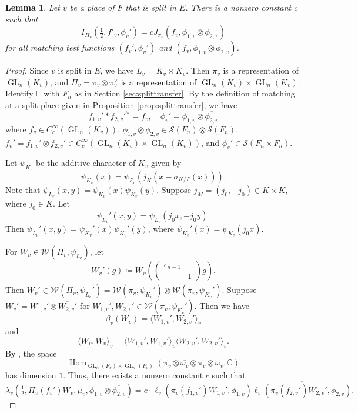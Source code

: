 \documentclass[11pt, reqno]{amsart}
\numberwithin{equation}{subsection}
\theoremstyle{plain}
\newtheorem{lem}[proposition]{Lemma}
\theoremstyle{definition}
\newcommand{\CC}{\mathbb C}
\newcommand{\LL}{\mathbb L}
\newcommand{\ol}{\overline}
\newcommand{\cS}{\mathcal S}
\newcommand{\W}{\mathcal W}
\DeclareMathOperator{\GL}{GL}
\DeclareMathOperator{\Hom}{Hom}
\begin{document}
\begin{lem}
\label{lem:splitlocaldistrid} 
Let $v$ be a place of $F$ that is split in $E$. 
There is a nonzero 
constant $c$ such that 
\[
    I_{\Pi_v}(\tfrac12, f'_v, \phi_v')
    = c J_{\pi_v}(f_v, \phi_{1,v} \otimes \phi_{2,v})
\]
for all matching test functions $(f_v', \phi_v')$
and $(f_v, \phi_{1,v} \otimes \phi_{2,v})$.
\end{lem}
\begin{proof}
Since $v$ is split in $E$, we have $L_v = K_v \times K_v$.
Then $\pi_v$ is a representation of
$\GL_n(K_v)$, and $\Pi_v = \pi_v \otimes \pi_v^\vee$
is a representation of $\GL_n(K_v) \times \GL_n(K_v)$.
Identify $\LL$ with $F_n$ as in Section 
\ref{sec:splittransfer}.
By the definition of matching at a split place given
in Proposition \ref{prop:splittransfer}, we have
\[
    f_{1,v}' \ast f_{2,v}'^\vee = f_v , \quad
    \phi_v' = \phi_{1,v} \otimes \ol{\phi_{2,v}}
\]
where $f_v \in C_c^\infty(\GL_n(K_v))$,
$\phi_{1,v} \otimes \phi_{2,v} \in \cS(F_n)\otimes
\cS(F_n)$, $f_v' = f_{1,v}' \otimes f_{2,v}' 
\in C_c^\infty(\GL_n(K_v) \times \GL_n(K_v))$,
and $\phi_v' \in \cS(F_n \times F_n)$.

Let $\psi_{K_v}$ be the additive character of $K_v$
given by
\[
    \psi_{K_v}(x) = \psi_{F_v}(j_K(x - \sigma_{K/F}(x))).
\]
Note that $\psi_{L_v}(x, y) = \psi_{K_v}(x)\psi_{K_v}(y)$.
Suppose $j_M = (j_0, -j_0) \in K \times K$, where
$j_0 \in K$.
Let 
\[
    \psi_{L_v}'(x, y) = \psi_{L_v}(j_0x, -j_0y).
\]
Then $\psi_{L_v}'(x, y) = \psi_{K_v}'(x)
\ol{\psi_{K_v}'(y)}$, where
$\psi_{K_v}'(x) = \psi_{K_v}(j_0x)$.

For $W_v \in \W(\Pi_v, \psi_{L_v})$, let
\[
    W_v'(g) \coloneqq W_v\left(\begin{pmatrix}
    \epsilon_{n-1} & \\ & 1
    \end{pmatrix} g\right).
\]
Then $W_v' \in \W(\Pi_v, \psi_{L_v}')
= \W(\pi_v, \psi_{K_v}') \otimes 
\ol{\W(\pi_v, \psi_{K_v}')}$. 
Suppose $W_v' = W_{1,v}' \otimes \ol{W_{2,v}'}$
for $W_{1,v}', W_{2,v}' \in \W(\pi_v, \psi_{K_v}')$.
Then we have
\[
    \beta_v(W_v) = \langle W_{1,v}', W_{2,v}' \rangle_v
\]
and
\[
    \langle W_v, W_v \rangle_v =
    \langle W_{1,v}', W_{1,v}'\rangle_v
    \langle W_{2,v}', W_{2,v}'\rangle_v.
\]
By \cite[Theorem~B]{Sun2012multiplicity}, the space
\[
    \Hom_{\GL_n(F_v) \times \GL_n(F_v)}(\pi_v 
    \otimes \ol{\omega_v} 
    \otimes \ol{\pi_v}
    \otimes \omega_v, \CC)
\]
has dimension $1$.
Thus, there exists a nonzero constant $c$ such that
\[
    \lambda_v(\tfrac12, \Pi_v(f_v')W_v, \mu_v, \phi_{1,v}
    \otimes \ol{\phi_{2,v}})
    = c\cdot \ell_v(\pi_v(f_{1,v}')W_{1,v}', 
    \phi_{1,v})\ol{\ell_v(\pi_v(\ol{f_{2,v}'}) W_{2,v}',
    \phi_{2,v})}.
\]


\end{proof}
\end{document}
